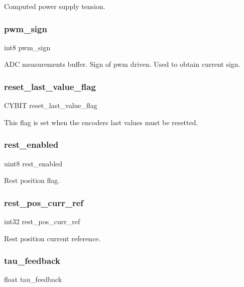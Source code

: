 Computed power supply tension. \mbox{\label{globals_8c_a8ac7ad7c894db750e93bc745818e26ca}} 
\subsubsection{pwm\+\_\+sign}
{\footnotesize\ttfamily int8 pwm\+\_\+sign}

A\+DC measurements buffer. Sign of pwm driven. Used to obtain current sign. \mbox{\label{globals_8c_aa89a782cfe75ce7970236babd308fe69}} 
\subsubsection{reset\+\_\+last\+\_\+value\+\_\+flag}
{\footnotesize\ttfamily C\+Y\+B\+IT reset\+\_\+last\+\_\+value\+\_\+flag}

This flag is set when the encoders last values must be resetted. \mbox{\label{globals_8c_a1f8839fadee52a47a0042eaa695c3f3a}} 
\subsubsection{rest\+\_\+enabled}
{\footnotesize\ttfamily uint8 rest\+\_\+enabled}

Rest position flag. \mbox{\label{globals_8c_a485e5b90bbfb79aa97f874873cd6c93a}} 
\subsubsection{rest\+\_\+pos\+\_\+curr\+\_\+ref}
{\footnotesize\ttfamily int32 rest\+\_\+pos\+\_\+curr\+\_\+ref}

Rest position current reference. \mbox{\label{globals_8c_a894b799ffe45f442a6a897580ab7e98e}} 
\subsubsection{tau\+\_\+feedback}
{\footnotesize\ttfamily float tau\+\_\+feedback}

